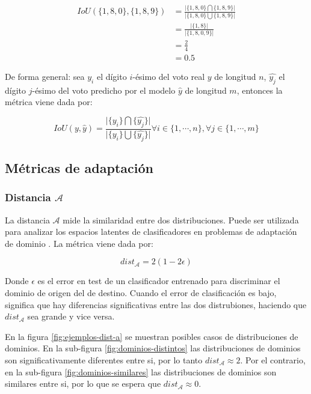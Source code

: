 \begin{align}
    IoU(\{1, 8, 0\}, \{1, 8, 9\}) & = \frac{\lvert\{1, 8, 0\} \bigcap \{1, 8, 9\}\rvert}{\lvert\{1, 8, 0\} \bigcup \{1, 8, 9\}\rvert} \nonumber \\
                                  & = \frac{\lvert\{1, 8\}\rvert}{\lvert\{1, 8, 0, 9\}\rvert}                                         \nonumber \\
                                  & = \frac{2}{4}                                                                     \nonumber                 \\
                                  & = 0.5
\end{align}

De forma general: sea $y_{i}$ el dígito $i$-ésimo del voto real $y$ de longitud $n$, $\hat{y_{j}}$ el dígito $j$-ésimo
del voto predicho por el modelo $\hat{y}$ de longitud $m$, entonces la métrica viene dada por:

\begin{equation}
    IoU(y, \hat{y}) = \frac{\lvert \{y_{i}\} \bigcap \{\hat{y_{j}}\}\rvert}{\lvert \{y_{i}\} \bigcup \{\hat{y_{j}}\}\rvert} \forall i \in \{1, \cdots, n\}, \forall j \in \{1, \cdots, m\}
\end{equation}

\subsection{Métricas de adaptación}
\subsubsection{Distancia $\mathcal{A}$}

La distancia $\mathcal{A}$ mide la similaridad entre dos distribuciones. Puede ser utilizada para analizar los espacios
latentes de clasificadores en problemas de adaptación de dominio \parencite{ben2006analysis}. La métrica viene dada por:

\begin{equation}
    dist_\mathcal{A} = 2 (1-2\epsilon)
\end{equation}

Donde $\epsilon$ es el error en test de un clasificador entrenado para discriminar el dominio de origen del de destino.
Cuando el error de clasificación es bajo, significa que hay diferencias significativas entre las dos distrubiones,
haciendo que $dist_\mathcal{A}$ sea grande y vice versa.

En la figura \ref{fig:ejemplos-dist-a} se muestran posibles casos de distribuciones de dominios. En la sub-figura
\ref{fig:dominios-distintos} las distribuciones de dominios son significativamente diferentes entre si, por lo tanto
$dist_\mathcal{A} \approx 2$. Por el contrario, en la sub-figura \ref{fig:dominios-similares} las distribuciones de
dominios son similares entre si, por lo que se espera que $dist_\mathcal{A} \approx 0$.

